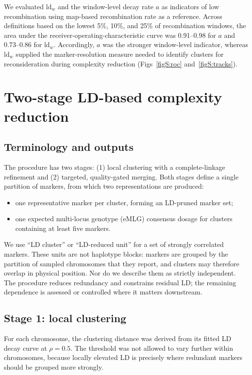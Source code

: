 \documentclass[11pt]{article}
\begin{document}
We evaluated \(\mathrm{ld}_w\) and the window-level decay rate \(a\) as
indicators of low recombination using map-based recombination rate as a
reference. Across definitions based on the lowest 5\%, 10\%, and 25\% of
recombination windows, the area under the receiver-operating-characteristic
curve was 0.91--0.98 for \(a\) and 0.73--0.86 for \(\mathrm{ld}_w\).
Accordingly, \(a\) was the stronger window-level indicator, whereas
\(\mathrm{ld}_w\) supplied the marker-resolution measure needed to identify
clusters for reconsideration during complexity reduction
(Figs~\ref{figS:roc} and~\ref{figS:tracks}).

\section{Two-stage LD-based complexity reduction}

\subsection{Terminology and outputs}

The procedure has two stages: (1) local clustering with a complete-linkage
refinement and (2) targeted, quality-gated merging. Both stages define a single
partition of markers, from which two representations are produced:
\begin{itemize}
  \item one representative marker per cluster, forming an LD-pruned marker set;
  \item one expected multi-locus genotype (eMLG) consensus dosage for clusters
        containing at least five markers.
\end{itemize}

We use ``LD cluster'' or ``LD-reduced unit'' for a set of strongly correlated
markers. These units are not haplotype blocks: markers are grouped by the
partition of sampled chromosomes that they report, and clusters may therefore
overlap in physical position. Nor do we describe them as strictly independent.
The procedure reduces redundancy and constrains residual LD; the remaining
dependence is assessed or controlled where it matters downstream.

\subsection{Stage 1: local clustering}

For each chromosome, the clustering distance was derived from its fitted LD
decay curve at \(\rho=0.5\). The threshold was not allowed to vary further
within chromosomes, because locally elevated LD is precisely where redundant
markers should be grouped more strongly.
\end{document}
